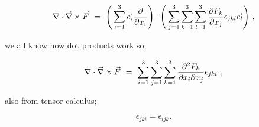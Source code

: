 \documentclass{article}
\begin{document}
\begin{equation} \label{eq:51}
\nabla\cdot\vec{\nabla} \times \vec{F} \hspace{0.125cm} = \hspace{0.125cm} \Bigg( \sum_{i=1}^{3} \vec{e_{i}} \frac{\partial}{\partial x_i} \Bigg)\cdot\Bigg( \sum_{j=1}^{3} \sum_{k=1}^{3} \sum_{l=1}^{3} \frac{\partial{F_k}}{\partial x_j}  \epsilon_{jkl} \vec{e_l} \Bigg) \hspace{0.125cm} ,
\end{equation}

we all know how dot products work so;

\begin{equation} \label{eq:51}
\nabla\cdot\vec{\nabla} \times \vec{F} \hspace{0.125cm} = \hspace{0.125cm} \sum_{i=1}^{3} \sum_{j=1}^{3} \sum_{k=1}^{3} \frac{\partial^{2}{F_k}}{\partial{x_i}\partial{x_j}} \epsilon_{jki} \hspace{0.125cm} ,
\end{equation}

also from tensor calculus;

\begin{equation} \label{eq:51}
\epsilon_{jki} = \epsilon_{ijk} .
\end{equation}
\end{document}
